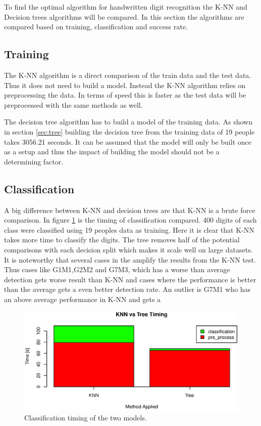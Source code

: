 To find the optimal algorithm for handwritten digit recognition the K-NN and Decision trees algorithms will be compared.
In this section the algorithms are compared based on training, classification and success rate.

\subsection{Training}
The K-NN algorithm is a direct comparison of the train data and the test data.
Thus it does not need to build a model.
Instead the K-NN algorithm relies on preprocessing the data.
In terms of speed this is faster as the test data will be preprocessed with the same methods as well.

The decision tree algorithm has to build a model of the training data. 
As shown in section \ref{sec:tree} building the decision tree from the training data of 19 people takes 3056.21 seconds.
It can be assumed that the model will only be built once as a setup and thus the impact of building the model should not be a determining factor.

\subsection{Classification}
A big difference between K-NN and decision trees are that K-NN is a brute force comparison.
In figure \ref{fig:algo_compare_timing} is the timing of classification compared.
400 digits of each class were classified using 19 peoples data as training.
Here it is clear that K-NN takes more time to classify the digits.
The tree removes half of the potential comparisons with each decision split which makes it scale well on large datasets.
It is noteworthy that several cases in the amplify the results from the K-NN test.
Thus cases like G1M1,G2M2 and G7M3, which has a worse than average detection gets worse result than K-NN 
and cases where the performance is better than the average gets a even better detection rate.
An outlier is G7M1 who has an above average performance in K-NN and gets a 

\begin{figure}[H]
\centering
\includegraphics[width=\textwidth]{graphics/algo_compare_timing}
\caption{Classification timing of the two models.}
\label{fig:algo_compare_timing}
\end{figure}

